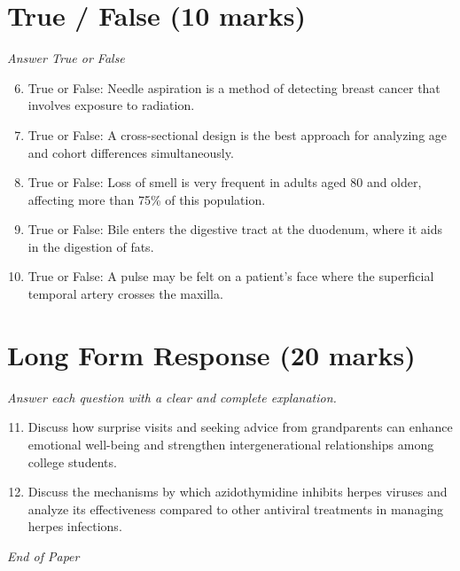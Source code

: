 \documentclass[12pt]{article}
\begin{document}
\section*{True / False (10 marks)}
\textit{Answer True or False}
\begin{enumerate}[label=\arabic*.]
\setcounter{enumi}{5}
\item True or False: Needle aspiration is a method of detecting breast cancer that involves exposure to radiation.
\item True or False: A cross-sectional design is the best approach for analyzing age and cohort differences simultaneously.
\item True or False: Loss of smell is very frequent in adults aged 80 and older, affecting more than 75\% of this population.
\item True or False: Bile enters the digestive tract at the duodenum, where it aids in the digestion of fats.
\item True or False: A pulse may be felt on a patient's face where the superficial temporal artery crosses the maxilla.
\end{enumerate}

\section*{Long Form Response (20 marks)}
\textit{Answer each question with a clear and complete explanation.}
\begin{enumerate}[label=\arabic*.]
\setcounter{enumi}{10}
\item Discuss how surprise visits and seeking advice from grandparents can enhance emotional well-being and strengthen intergenerational relationships among college students.
\item Discuss the mechanisms by which azidothymidine inhibits herpes viruses and analyze its effectiveness compared to other antiviral treatments in managing herpes infections.
\end{enumerate}

\vfill
\noindent\textit{End of Paper}
\end{document}
